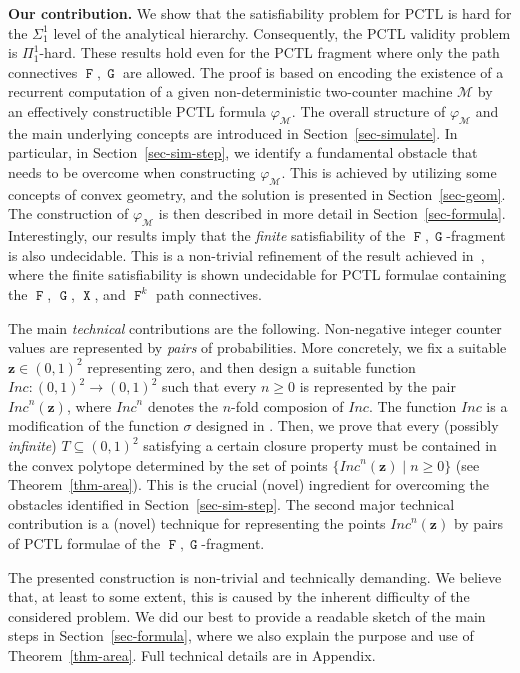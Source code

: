 \documentclass[a4paper,UKenglish,cleveref, autoref, thm-restate]{lipics-v2021}
\newcommand{\M}{\mathcal{M}}
\newcommand{\INC}{\mathit{Inc}}
\renewcommand{\vec}[1]{\pmb{#1}}
\newcommand{\fp}{Appendix}
\newcommand*{\opx}{\operatorname{\pmb{\mathtt{X}}}}
\newcommand*{\opf}{\operatorname{\pmb{\mathtt{F}}}}
\newcommand*{\opg}{\operatorname{\pmb{\mathtt{G}}}}
\begin{document}
\noindent
\textbf{Our contribution.} We show that the satisfiability problem for PCTL is hard for the $\Sigma_1^1$ level of the analytical hierarchy. Consequently, the PCTL validity problem is $\Pi_1^1$-hard. These results hold even for the PCTL fragment where only the path connectives $\opf,\opg$ are allowed. The proof is based on encoding the existence of a recurrent computation of a given non-deterministic two-counter machine $\M$ by an effectively constructible PCTL formula $\varphi_\M$. The overall structure of $\varphi_\M$ and the main underlying concepts are introduced in Section~\ref{sec-simulate}. In particular, in Section~\ref{sec-sim-step}, we identify a fundamental obstacle that needs to be overcome when constructing $\varphi_\M$. This is achieved by utilizing some concepts of convex geometry, and the solution is presented in Section~\ref{sec-geom}. The construction of $\varphi_\M$ is then described in more detail in Section~\ref{sec-formula}. Interestingly, our results imply that the \emph{finite} satisfiability of the $\opf,\opg$-fragment is also undecidable. This is a non-trivial refinement of the result achieved in~\cite{ChK:PCTL-finite-sat-LICS}, where the finite satisfiability is shown undecidable for PCTL formulae containing the $\opf$, $\opg$, $\opx$, and $\opf^k$ path connectives. 

The main \emph{technical} contributions are the following. Non-negative integer counter values are represented by \emph{pairs} of probabilities. More concretely, we fix a suitable $\vec{z} \in (0,1)^2$ representing zero, and then design a suitable function $\INC :(0,1)^2 \to (0,1)^2$ such that every $n \geq 0$ is represented by the pair $\INC^n(\vec{z})$, where $\INC^n$ denotes the $n$-fold composion of $\INC$. The function $\INC$ is a modification of the function $\sigma$ designed in \cite{ChK:PCTL-finite-sat-LICS}. Then, we prove that every (possibly \emph{infinite}) $T \subseteq (0,1)^2$ satisfying a certain closure property must be contained in the convex polytope determined by the set of points $\{\INC^n(\vec{z}) \mid n\geq 0\}$ (see Theorem~\ref{thm-area}). This is the crucial (novel) ingredient for overcoming the obstacles identified in Section~\ref{sec-sim-step}. The second major technical contribution is a (novel) technique for representing the points $\INC^n(\vec{z})$ by pairs of PCTL formulae of the $\opf,\opg$-fragment. 

The presented construction is non-trivial and technically demanding. We believe that, at least to some extent, this is caused by the inherent difficulty of the considered problem. We did our best to provide a readable sketch of the main steps in Section~\ref{sec-formula}, where we also explain the purpose and use of Theorem~\ref{thm-area}. Full technical details are in \fp.
\end{document}
